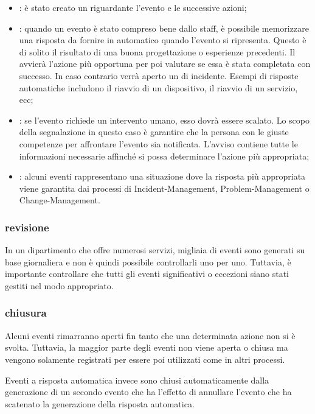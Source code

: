 \begin{itemize}
\item{: è stato creato un  riguardante l'evento e le successive azioni;}
\item{: quando un evento è stato compreso bene dallo staff, è possibile memorizzare una risposta da fornire in automatico quando l'evento si ripresenta. Questo è di solito il risultato di una buona progettazione o esperienze precedenti. Il  avvierà l'azione più opportuna per poi valutare se essa è stata completata con successo. In caso contrario verrà aperto un  di incidente. Esempi di risposte automatiche includono il riavvio di un dispositivo, il riavvio di un servizio, ecc;}
\item{: se l'evento richiede un intervento umano, esso dovrà essere scalato. Lo scopo della segnalazione in questo caso è garantire che la persona con le giuste competenze per affrontare l'evento sia notificata. L'avviso contiene tutte le informazioni necessarie affinché si possa determinare l'azione più appropriata;}
\item{: alcuni eventi rappresentano una situazione dove la risposta più appropriata viene garantita dai processi di \ac{Incident-Management}, \ac{Problem-Management} o \ac{Change-Management}.}
\end{itemize}

\subsubsection[Revisione]{revisione}
In un dipartimento che offre numerosi servizi, migliaia di eventi sono generati su base giornaliera e non è quindi possibile controllarli uno per uno. Tuttavia, è importante controllare che tutti gli eventi significativi o eccezioni siano stati gestiti nel modo appropriato.

\subsubsection[Chiusura]{chiusura}
Alcuni eventi rimarranno aperti fin tanto che una determinata azione non si è svolta. Tuttavia, la maggior parte degli eventi non viene aperta o chiusa ma vengono solamente registrati per essere poi utilizzati come  in altri processi.

Eventi a risposta automatica invece sono chiusi automaticamente dalla generazione di un secondo evento che ha l'effetto di annullare l'evento che ha scatenato la generazione della risposta automatica.

